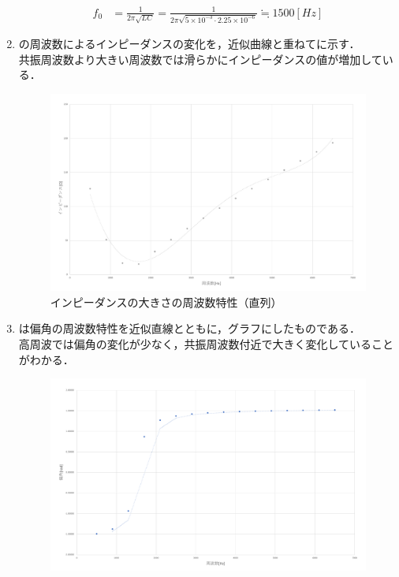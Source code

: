 \documentclass[11pt,dvipdfmx]{jarticle}
\begin{document}
\begin{enumerate}
\begin{align}
\label{eq:5}
f_0&=\frac{1}{2\pi \sqrt{LC}}=\frac{1}{2\pi \sqrt{5\times 10^{-3}\cdot 2.25\times 10^{-6}}} \fallingdotseq 1500[Hz]
\end{align}
\item {}の周波数によるインピーダンスの変化を，近似曲線と重ねてに示す．\\
共振周波数より大きい周波数では滑らかにインピーダンスの値が増加している．
\begin{figure}
 \centering
 \includegraphics[scale=0.45]{./fig/graph1.pdf}
 \caption{インピーダンスの大きさの周波数特性（直列）}
 \label{fig:fig5}
\end{figure}
\item {}は偏角の周波数特性を近似直線とともに，グラフにしたものである．\\
高周波では偏角の変化が少なく，共振周波数付近で大きく変化していることがわかる．
\begin{figure}
 \centering
 \includegraphics[scale=0.45]{./fig/graph2.pdf}

\end{figure}
\end{enumerate}
\end{document}
